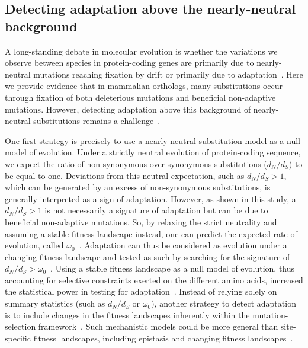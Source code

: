 \documentclass{article}
\newcommand{\dn}{d_N}
\newcommand{\ds}{d_S}
\newcommand{\dnds}{\dn / \ds}
\begin{document}
    \subsection*{Detecting adaptation above the nearly-neutral background}

    A long-standing debate in molecular evolution is whether the variations we observe between species in protein-coding genes are primarily due to nearly-neutral mutations reaching fixation by drift or primarily due to adaptation~\cite{kimura_evolutionary_1968,jensen_importance_2019,gillespie_substitution_1994,ohta_nearly_1992}.
    Here we provide evidence that in mammalian orthologs, many substitutions occur through fixation of both deleterious mutations and beneficial non-adaptive mutations.
    However, detecting adaptation above this background of nearly-neutral substitutions remains a challenge~\cite{kimura_evolutionary_1968,ohta_development_1996}.

    One first strategy is precisely to use a nearly-neutral substitution model as a null model of evolution.
    Under a strictly neutral evolution of protein-coding sequence, we expect the ratio of non-synonymous over synonymous substitutions ($\dnds$) to be equal to one.
    Deviations from this neutral expectation, such as $\dnds > 1$, which can be generated by an excess of non-synonymous substitutions, is generally interpreted as a sign of adaptation.
    However, as shown in this study, a $\dnds > 1$ is not necessarily a signature of adaptation but can be due to beneficial non-adaptive mutations.
    So, by relaxing the strict neutrality and assuming a stable fitness landscape instead, one can predict the expected rate of evolution, called $\omega_0$~\cite{spielman_relationship_2015, dosreis_how_2015}.
    Adaptation can thus be considered as evolution under a changing fitness landscape and tested as such by searching for the signature of $\dnds > \omega_0$~\cite{cvijovic_fate_2015, rodrigue_detecting_2017, rodrigue_bayesian_2021}.
    Using a stable fitness landscape as a null model of evolution, thus accounting for selective constraints exerted on the different amino acids, increased the statistical power in testing for adaptation~\cite{latrille_genes_2023}.
    Instead of relying solely on summary statistics (such as $\dnds$ or $\omega_0$), another strategy to detect adaptation is to include changes in the fitness landscapes inherently within the mutation-selection framework~\cite{tamuri_mutationselection_2021}.
    Such mechanistic models could be more general than site-specific fitness landscapes, including epistasis and changing fitness landscapes~\cite{goldstein_sequence_2017, stolyarova_senescence_2020}.
\end{document}
